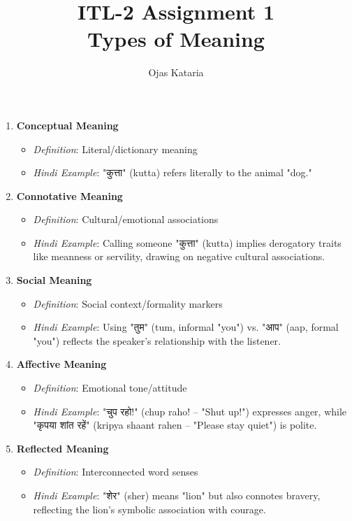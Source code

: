 \documentclass{article}
\title{ITL-2 Assignment 1 \\Types of Meaning}
\author{Ojas Kataria}
\date{}
\begin{document}
	\maketitle
	
	\begin{enumerate}[leftmargin=*]
		\item \textbf{Conceptual Meaning} 
		\begin{itemize}
			\item \textit{Definition}: Literal/dictionary meaning
			\item \textit{Hindi Example}: "कुत्ता" (kutta) refers literally to the animal "dog."
		\end{itemize}
		
		\item \textbf{Connotative Meaning}
		\begin{itemize}
			\item \textit{Definition}: Cultural/emotional associations
			\item \textit{Hindi Example}: Calling someone "कुत्ता" (kutta) implies derogatory traits like meanness or servility, drawing on negative cultural associations.
		\end{itemize}
		
		\item \textbf{Social Meaning}
		\begin{itemize}
			\item \textit{Definition}: Social context/formality markers
			\item \textit{Hindi Example}: Using "तुम" (tum, informal "you") vs. "आप" (aap, formal "you") reflects the speaker's relationship with the listener.
		\end{itemize}
		
		\item \textbf{Affective Meaning}
		\begin{itemize}
			\item \textit{Definition}: Emotional tone/attitude
			\item \textit{Hindi Example}:  "चुप रहो!" (chup raho! – "Shut up!") expresses anger, while "कृपया शांत रहें" (kripya shaant rahen – "Please stay quiet") is polite.
		\end{itemize}
		
		\item \textbf{Reflected Meaning}
		\begin{itemize}
			\item \textit{Definition}: Interconnected word senses
			\item \textit{Hindi Example}: "शेर" (sher) means "lion" but also connotes bravery, reflecting the lion's symbolic association with courage.
		\end{itemize}
		

\end{enumerate}
\end{document}
